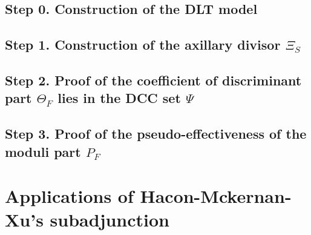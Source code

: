 \documentclass[11pt]{article}
\theoremstyle{definition}
\begin{document}
	\subsection{Step 0. Construction of the DLT model}
	
	\subsection{Step 1. Construction of the axillary divisor $\Xi_S$}
	
	\subsection{Step 2. Proof of the coefficient of discriminant part $\Theta_F$ lies in the DCC set $\Psi$}
	
	\subsection{Step 3. Proof of the pseudo-effectiveness of the moduli part $P_F$}
	
	\section{Applications of Hacon-Mckernan-Xu's subadjunction}
	
	
	
	
\end{document}
